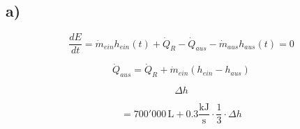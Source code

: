 

\subsection*{a)}

\begin{equation*}
\frac{dE}{dt} = \dot{m}_{ein} h_{ein}(t) + \dot{Q}_R - \dot{Q}_{aus} - \dot{m}_{aus} h_{aus}(t) = 0
\end{equation*}

\begin{equation*}
\dot{Q}_{aus} = \dot{Q}_R + \dot{m}_{ein} \left( h_{ein} - h_{aus} \right)
\end{equation*}

\begin{equation*}
\Delta h
\end{equation*}

\begin{equation*}
= 700'000 \, \text{L} + 0.3 \frac{\text{kJ}}{\text{s}} \cdot \frac{1}{3} \cdot \Delta h
\end{equation*}